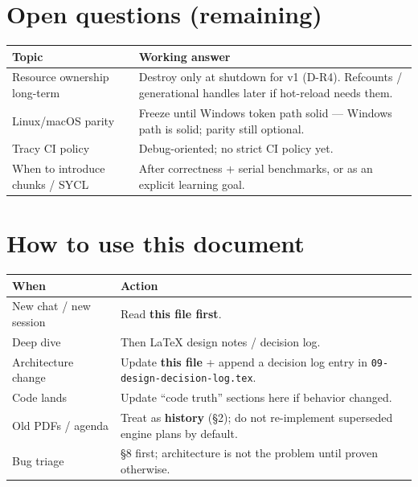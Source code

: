 \documentclass[10pt,a4paper]{article}
\begin{document}
\section{Open questions (remaining)}
\begin{table}[h!]
\centering
\small
\begin{tabularx}{\textwidth}{l X}
\toprule
\textbf{Topic} & \textbf{Working answer} \\
\midrule
Resource ownership long-term & Destroy only at shutdown for v1 (D-R4). Refcounts / generational handles later if hot-reload needs them. \\
Linux/macOS parity & Freeze until Windows token path solid --- Windows path is solid; parity still optional. \\
Tracy CI policy & Debug-oriented; no strict CI policy yet. \\
When to introduce chunks / SYCL & After correctness + serial benchmarks, or as an explicit learning goal. \\
\bottomrule
\end{tabularx}
\end{table}

\section{How to use this document}
\begin{table}[h!]
\centering
\small
\begin{tabularx}{\textwidth}{l X}
\toprule
\textbf{When} & \textbf{Action} \\
\midrule
New chat / new session & Read \textbf{this file first}. \\
Deep dive & Then LaTeX design notes / decision log. \\
Architecture change & Update \textbf{this file} + append a decision log entry in \texttt{09-design-decision-log.tex}. \\
Code lands & Update ``code truth'' sections here if behavior changed. \\
Old PDFs / agenda & Treat as \textbf{history} (\S 2); do not re-implement superseded engine plans by default. \\
Bug triage & \S 8 first; architecture is not the problem until proven otherwise. \\
\bottomrule
\end{tabularx}
\end{table}

\newpage
\appendix
\end{document}
